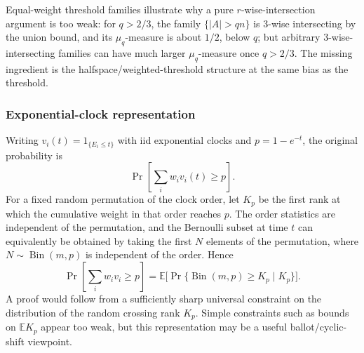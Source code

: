 \documentclass[12pt]{article}
\begin{document}
Equal-weight threshold families illustrate why a pure \(r\)-wise-intersection
argument is too weak: for \(q>2/3\), the family
\(\{|A|>qn\}\) is \(3\)-wise intersecting by the union bound, and its
\(\mu_q\)-measure is about \(1/2\), below \(q\); but arbitrary
\(3\)-wise-intersecting families can have much larger \(\mu_q\)-measure once
\(q>2/3\).  The missing ingredient is the halfspace/weighted-threshold
structure at the same bias as the threshold.

\subsubsection*{Exponential-clock representation}

Writing \(v_i(t)=1_{\{E_i\le t\}}\) with iid exponential clocks and
\(p=1-e^{-t}\), the original probability is
\[
   \Pr\left[\sum_i w_i v_i(t)\ge p\right].
\]
For a fixed random permutation of the clock order, let \(K_p\) be the first
rank at which the cumulative weight in that order reaches \(p\).  The order
statistics are independent of the permutation, and the Bernoulli subset at
time \(t\) can equivalently be obtained by taking the first \(N\) elements of
the permutation, where \(N\sim\operatorname{Bin}(m,p)\) is independent of the
order.  Hence
\[
   \Pr\left[\sum_i w_i v_i\ge p\right]
   =\mathbb E\big[\Pr\{\operatorname{Bin}(m,p)\ge K_p\mid K_p\}\big].
\]
A proof would follow from a sufficiently sharp universal constraint on the
distribution of the random crossing rank \(K_p\).  Simple constraints such as
bounds on \(\mathbb E K_p\) appear too weak, but this representation may be a
useful ballot/cyclic-shift viewpoint.
\end{document}
